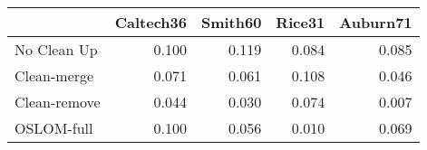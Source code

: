 \begin{tabular}{lrrrr}
\toprule
{} & Caltech36 & Smith60 & Rice31 & Auburn71 \\
\midrule
No Clean Up  &     0.100 &   0.119 &  0.084 &    0.085 \\
Clean-merge  &     0.071 &   0.061 &  0.108 &    0.046 \\
Clean-remove &     0.044 &   0.030 &  0.074 &    0.007 \\
OSLOM-full   &     0.100 &   0.056 &  0.010 &    0.069 \\
\bottomrule
\end{tabular}
